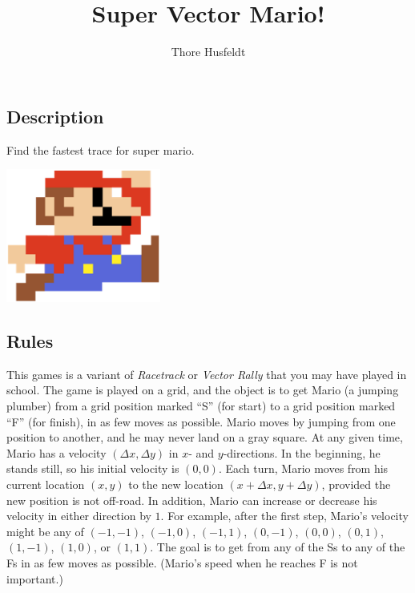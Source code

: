 \documentclass{tufte-handout}
\title{Super Vector Mario!}
\author{Thore Husfeldt}
\begin{document}
\maketitle

\subsection{Description}
Find the fastest trace for super mario.

\begin{marginfigure}
\includegraphics[width = 2in]{mario.png}
\end{marginfigure}

\subsection{Rules}
This games is a variant of \emph{Racetrack} or \emph{Vector Rally} that you may have played in school.
The game is played on a grid, and the object is to get Mario (a jumping plumber) from a grid position marked ``S'' (for start) to a grid position marked ``F'' (for finish), in as few moves as possible.
Mario moves by jumping from one position to another, and he may never land on a gray square.
At any given time, Mario has a velocity $(\Delta x, \Delta y)$ in $x$- and $y$-directions.
In the beginning, he stands still, so his initial velocity is $(0,0)$.
Each turn, Mario moves from his current location $(x,y)$ to the new location $(x+\Delta x, y+\Delta y)$, provided the new position is not off-road.
In addition, Mario can increase or decrease his velocity in either direction by $1$.
For example, after the first step, Mario’s velocity might be any of $(-1,-1)$,  $(-1,0)$, $(-1,1)$, $(0,-1)$, $(0,0)$, $(0,1)$, $(1,-1)$, $(1,0)$, or $(1,1)$.
The goal is to get from any of the Ss to any of the Fs in as few moves as possible.
(Mario's speed when he reaches F is not important.)
\end{document}

